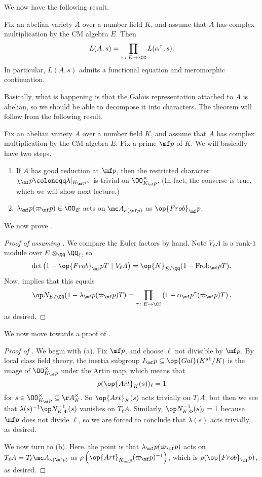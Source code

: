 \documentclass[../notes.tex]{subfiles}
\begin{document}
We now have the following result.
\begin{theorem} \label{thm:l-func-cm-av}
	Fix an abelian variety $A$ over a number field $K$, and assume that $A$ has complex multiplication by the CM algebra $E$. Then
	\[L(A,s)=\prod_{\tau\colon E\to\CC}L(\alpha^\tau,s).\]
	In particular, $L(A,s)$ admits a functional equation and meromorphic continuation.
\end{theorem}
Basically, what is happening is that the Galois representation attached to $A$ is abelian, so we should be able to decompose it into characters. The theorem will follow from the following result.
\begin{proposition} \label{prop:frob-action-on-cm-av}
	Fix an abelian variety $A$ over a number field $K$, and assume that $A$ has complex multiplication by the CM algebra $E$. Fix a prime $\mf p$ of $K$. We will basically have two steps.
	\begin{enumerate}
		\item If $A$ has good reduction at $\mf p$, then the restricted character $\chi_\mf p\coloneqq\lambda|_{K_\mf p^\times}$ is trivial on $\OO_{K_\mf p}^\times$. (In fact, the converse is true, which we will show next lecture.)
		\item $\lambda_\mf p(\varpi_\mf p)\in\OO_E$ acts on $\mc A_{\kappa(\mf p)}$ as $\op{Frob}_\mf p$.
	\end{enumerate}
\end{proposition}
We now prove .
\begin{proof}[Proof of  assuming ]
	We compare the Euler factors by hand. Note $V_\ell A$ is a rank-$1$ module over $E\otimes_\QQ\QQ_\ell$, so
	\[\det\left(1-{\op{Frob}_\mf p}T~|~V_\ell A\right)=\op{N}_{E/\QQ}(1-\mathrm{Frob}_\mf pT).\]
	Now,  implies that this equals
	\[\op N_{E/\QQ}(1-\lambda_\mf p(\varpi_\mf p)T)=\prod_{\tau\colon E\to\CC}\left(1-\alpha_\mf p^\tau(\varpi_\mf p)T\right),\]
	as desired.
\end{proof}
We now move towards a proof of .
\begin{proof}[Proof of ]
	We begin with (a). Fix $\mf p$, and choose $\ell$ not divisible by $\mf p$. By local class field theory, the inertia subgroup $I_\mf p\subseteq\op{Gal}(K^{\mathrm{ab}}/K)$ is the image of $\OO_{K_\mf p}^\times$ under the Artin map, which means that
	\[\rho(\op{Art}_K(s))_\ell=1\]
	for $s\in\OO_{K_\mf p}^\times\subseteq\AA_K^\times$. So $\op{Art}_K(s)$ acts trivially on $T_\ell A$, but then we see that $\lambda(s)^{-1}\op N_{K,\Phi}^{-1}(s)$ vanishes on $T_\ell A$. Similarly, $\op N_{K,\Phi}^{-1}(s)_\ell=1$ because $\mf p$ does not divide $\ell$, so we are forced to conclude that $\lambda(s)$ acts trivially, as desired.

	We now turn to (b). Here, the point is that $\lambda_\mf p(\varpi_\mf p)$ acts on $T_\ell A=T_\ell\mc A_{\kappa(\mf p)}$ as $\rho\left(\op{Art}_{K_\mf p}(\varpi_\mf p)^{-1}\right)$, which is $\rho({\op{Frob}_\mf p})$, as desired.
\end{proof}
\end{document}
